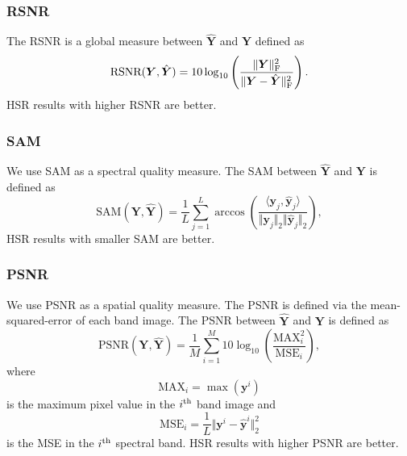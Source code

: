 \subsubsection{RSNR}
The RSNR is a global measure between $\hat{\bm Y}$ and $\bm Y$ defined as
\[%
    \text{RSNR}(\bm Y,\hat{\bm Y}) = 10 \log_{10}\left( \frac{\Vert \bm Y \Vert\Fr^2}{\Vert \bm Y - \hat{\bm Y} \Vert\Fr^2} \right).
\]%
HSR results with higher RSNR are better.

\subsubsection{SAM}
We use SAM as a spectral quality measure.
The SAM between $\hat{\bm Y}$ and $\bm Y$ is defined as
\[%
    \text{SAM}(\bm Y,\hat{\bm Y}) =
    \frac{1}{L} \sum_{j=1}^{L}
    \arccos
    \left( \frac{ \langle \bm y_j , \hat{\bm y}_j \rangle }
                { \Vert \bm y_j \Vert_2 \Vert \hat{\bm y}_j \Vert_2 } \right),
\]%
HSR results with smaller SAM are better.

\subsubsection{PSNR}
We use PSNR as a spatial quality measure.
The PSNR is defined via the mean-squared-error of each band image.
The PSNR between $\hat{\bm Y}$ and $\bm Y$ is defined as
\[%
    \text{PSNR}(\bm Y , \hat{\bm Y}) =
    \frac{1}{M} \sum_{i=1}^{M} 10 \log_{10}
    \left( \frac{\text{MAX}_i^2}{\text{MSE}_i} \right),
\]%
where
\[
\text{MAX}_i = \max(\bm y^i)
\]
is the maximum pixel value in the $i^\text{th}$ band image and
\[
\text{MSE}_i = \frac{1}{L} \Vert \bm y^i - \hat{\bm y}^i \Vert_2^2
\]
is the MSE in the $i^\text{th}$ spectral band.
HSR results with higher PSNR are better.

